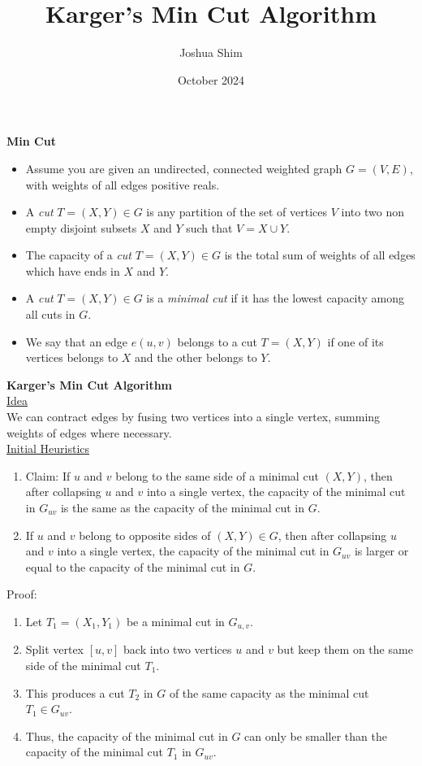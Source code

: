 \documentclass[12pt, letterpaper]{article}
\title{Karger's Min Cut Algorithm}
\author{Joshua Shim}
\date{October 2024}
\begin{document}
\maketitle
\newpage
\textbf{Min Cut}\\
\begin{itemize}
    \item Assume you are given an undirected, connected weighted graph $G = (V, E)$, with weights of all edges positive reals.
    \item A \textit{cut} $T=(X,Y) \in G$ is any partition of the set of vertices $V$ into two non empty disjoint subsets $X$ and $Y$ such that $V = X \cup Y$.
    \item The capacity of a \textit{cut} $T = (X, Y)\in G$ is the total sum of weights of all edges which have ends in $X$ and $Y$.
    \item A \textit{cut} $T = (X,Y)\in G$ is a \textit{minimal cut} if it has the lowest capacity among all cuts in $G$.
    \item We say that an edge $e(u,v)$ belongs to a cut $T = (X,Y)$ if one of its vertices belongs to $X$ and the other belongs to $Y$.
\end{itemize}
\textbf{Karger's Min Cut Algorithm}\\
\underline{Idea}\\
We can contract edges by fusing two vertices into a single vertex, summing weights of edges where necessary.\\
\underline{Initial Heuristics}\\
\begin{enumerate}
    \item Claim: If $u$ and $v$ belong to the same side of a minimal cut $(X, Y)$, then after collapsing $u$ and $v$ into a single vertex, the capacity of the minimal cut in $G_{uv}$ is the same as the capacity of the minimal cut in $G$.
    \item If $u$ and $v$ belong to opposite sides of $(X,Y)\in G$, then after collapsing $u$ and $v$ into a single vertex, the capacity of the minimal cut in $G_{uv}$ is larger or equal to the capacity of the minimal cut in $G$.
\end{enumerate}
Proof:\\
\begin{enumerate}
    \item Let $T_1 = (X_1, Y_1)$ be a minimal cut in $G_{u, v}$.
    \item Split vertex $[u, v]$ back into two vertices $u$ and $v$ but keep them on the same side of the minimal cut $T_1$.
    \item This produces a cut $T_2$ in $G$ of the same capacity as the minimal cut $T_1 \in G_{uv}$.
    \item Thus, the capacity of the minimal cut in $G$ can only be smaller than the capacity of the minimal cut $T_1$ in $G_{uv}$.
\end{enumerate}
\end{document}
